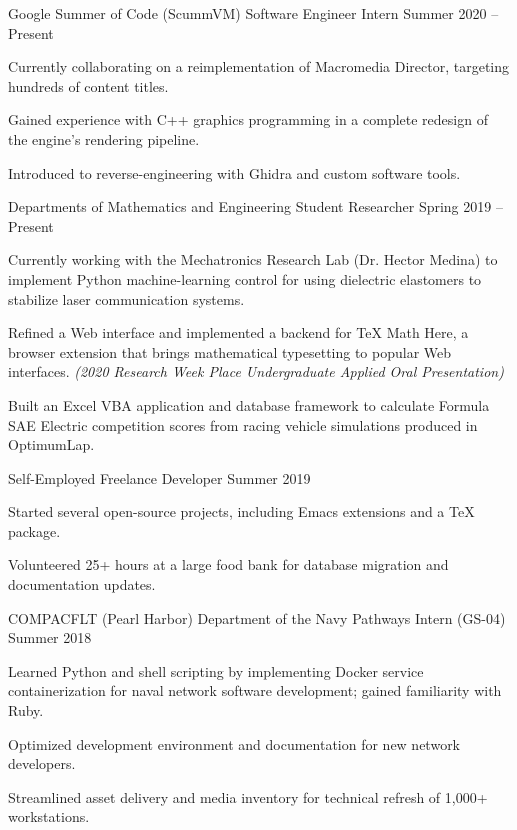 \documentclass{awesome-cv}
\begin{document}
\begin{cventries}
  \cventry
  {Google Summer of Code (ScummVM)}
  {Software Engineer Intern}
  {}
  {Summer 2020 -- Present}
  {
    \begin{cvitems}
      \item Currently collaborating on a reimplementation of Macromedia Director, targeting hundreds of content titles.
      \item Gained experience with C++ graphics programming in a complete redesign of the engine's rendering pipeline.
      \item Introduced to reverse-engineering with Ghidra and custom software tools.
    \end{cvitems}
  }

  \cventry
  {Departments of Mathematics and Engineering}
  {Student Researcher}
  {}
  {Spring 2019 -- Present}
  {
    \begin{cvitems}
    \item Currently working with the Mechatronics Research Lab (Dr. Hector Medina) to implement Python machine-learning control for using dielectric elastomers to stabilize laser communication systems.
    \item Refined a Web interface and implemented a backend for \TeX{} Math Here, a browser extension that brings mathematical typesetting to popular Web interfaces. \textit{(2020 Research Week  Place Undergraduate Applied Oral Presentation)}
    \item Built an Excel VBA application and database framework to calculate Formula SAE Electric competition scores from racing vehicle simulations produced in OptimumLap.
    \end{cvitems}
  }

  \cventry
  {Self-Employed}
  {Freelance Developer}
  {}
  {Summer 2019}
  {
    \begin{cvitems}
    \item Started several open-source projects, including Emacs extensions and a \TeX{} package.
    \item Volunteered 25+ hours at a large food bank for database migration and
     documentation updates.
    \end{cvitems}
  }

  \cventry
  {COMPACFLT (Pearl Harbor)}
  {Department of the Navy Pathways Intern (GS-04)}
  {}
  {Summer 2018}
  {
    \begin{cvitems}
    \item Learned Python and shell scripting by implementing Docker service containerization for naval network software development; gained familiarity with Ruby.
    \item Optimized development environment and documentation for new network
      developers.
    \item Streamlined asset delivery and media inventory for technical refresh of
      1,000+ workstations.
    \end{cvitems}
  }
\end{cventries}
\end{document}
